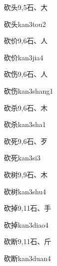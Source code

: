 \begin{Entry}{砍头}{9,5}{⽯、⼤}
  \begin{Phonetics}{砍头}{kan3tou2}
  \end{Phonetics}
\end{Entry}

\begin{Entry}{砍价}{9,6}{⽯、⼈}
  \begin{Phonetics}{砍价}{kan3jia4}
  \end{Phonetics}
\end{Entry}

\begin{Entry}{砍伤}{9,6}{⽯、⼈}
  \begin{Phonetics}{砍伤}{kan3shang1}
  \end{Phonetics}
\end{Entry}

\begin{Entry}{砍杀}{9,6}{⽯、⽊}
  \begin{Phonetics}{砍杀}{kan3sha1}
  \end{Phonetics}
\end{Entry}

\begin{Entry}{砍死}{9,6}{⽯、⽍}
  \begin{Phonetics}{砍死}{kan3si3}
  \end{Phonetics}
\end{Entry}

\begin{Entry}{砍树}{9,9}{⽯、⽊}
  \begin{Phonetics}{砍树}{kan3shu4}
  \end{Phonetics}
\end{Entry}

\begin{Entry}{砍掉}{9,11}{⽯、⼿}
  \begin{Phonetics}{砍掉}{kan3diao4}
  \end{Phonetics}
\end{Entry}

\begin{Entry}{砍断}{9,11}{⽯、⽄}
  \begin{Phonetics}{砍断}{kan3duan4}
  \end{Phonetics}
\end{Entry}

